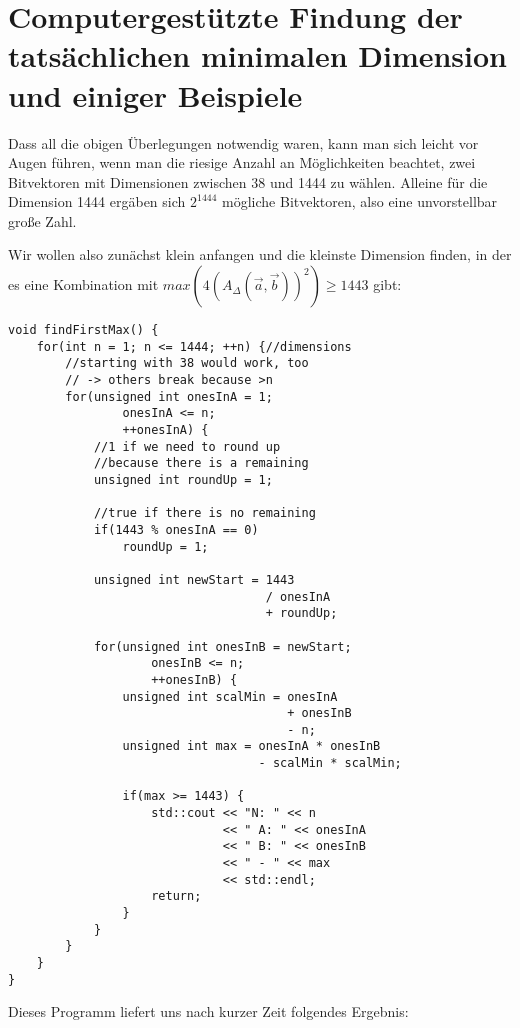 \documentclass{article}
\begin{document}
\section{Computergestützte Findung der tatsächlichen minimalen Dimension und einiger Beispiele}

Dass all die obigen Überlegungen notwendig waren, kann man sich leicht vor Augen führen, wenn man die riesige Anzahl an Möglichkeiten beachtet, zwei Bitvektoren mit Dimensionen zwischen 38 und 1444 zu wählen. Alleine für die Dimension 1444 ergäben sich $2^{1444}$ mögliche Bitvektoren, also eine unvorstellbar große Zahl. 

Wir wollen also zunächst klein anfangen und die kleinste Dimension finden, in der es eine Kombination mit $max(4(A_\Delta(\vec a,\vec b))^2) \geq 1443$ gibt:

\lstset{language=C++}

\begin{lstlisting}[frame=single]
void findFirstMax() {
    for(int n = 1; n <= 1444; ++n) {//dimensions
        //starting with 38 would work, too
        // -> others break because >n
        for(unsigned int onesInA = 1;
                onesInA <= n;
                ++onesInA) {
            //1 if we need to round up
            //because there is a remaining
            unsigned int roundUp = 1;

            //true if there is no remaining
            if(1443 % onesInA == 0)
                roundUp = 1;

            unsigned int newStart = 1443
                                    / onesInA
                                    + roundUp;

            for(unsigned int onesInB = newStart;
                    onesInB <= n;
                    ++onesInB) {
                unsigned int scalMin = onesInA
                                       + onesInB
                                       - n;
                unsigned int max = onesInA * onesInB
                                   - scalMin * scalMin;

                if(max >= 1443) {
                    std::cout << "N: " << n
                              << " A: " << onesInA
                              << " B: " << onesInB
                              << " - " << max
                              << std::endl;
                    return;
                }
            }
        }
    }
}
\end{lstlisting}

\clearpage
Dieses Programm liefert uns nach kurzer Zeit folgendes Ergebnis:
\end{document}
